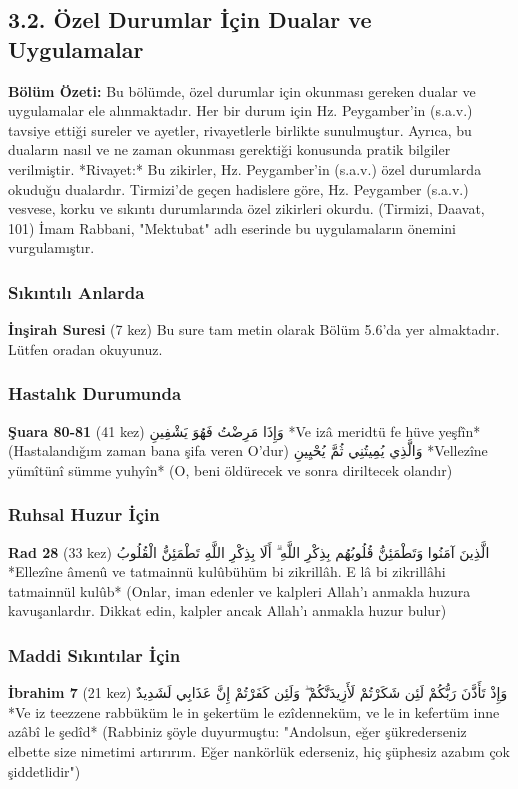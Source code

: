 \documentclass[12pt,a4paper]{article}
\begin{document}
\subsection{3.2. Özel Durumlar İçin Dualar ve Uygulamalar}
\textbf{Bölüm Özeti:}
Bu bölümde, özel durumlar için okunması gereken dualar ve uygulamalar ele alınmaktadır. Her bir durum için Hz. Peygamber'in (s.a.v.) tavsiye ettiği sureler ve ayetler, rivayetlerle birlikte sunulmuştur. Ayrıca, bu duaların nasıl ve ne zaman okunması gerektiği konusunda pratik bilgiler verilmiştir.
*Rivayet:* Bu zikirler, Hz. Peygamber'in (s.a.v.) özel durumlarda okuduğu dualardır. Tirmizi'de geçen hadislere göre, Hz. Peygamber (s.a.v.) vesvese, korku ve sıkıntı durumlarında özel zikirleri okurdu. (Tirmizi, Daavat, 101) İmam Rabbani, "Mektubat" adlı eserinde bu uygulamaların önemini vurgulamıştır.
\subsubsection{Sıkıntılı Anlarda}
\textbf{İnşirah Suresi} (7 kez)
Bu sure tam metin olarak Bölüm 5.6'da yer almaktadır. Lütfen oradan okuyunuz.
\subsubsection{Hastalık Durumunda}
\textbf{Şuara 80-81} (41 kez)
وَإِذَا مَرِضْتُ فَهُوَ يَشْفِينِ
*Ve izâ meridtü fe hüve yeşfîn*
(Hastalandığım zaman bana şifa veren O'dur)
وَالَّذِي يُمِيتُنِي ثُمَّ يُحْيِينِ
*Vellezîne yümîtünî sümme yuhyîn*
(O, beni öldürecek ve sonra diriltecek olandır)
\subsubsection{Ruhsal Huzur İçin}
\textbf{Rad 28} (33 kez)
الَّذِينَ آمَنُوا وَتَطْمَئِنُّ قُلُوبُهُم بِذِكْرِ اللَّهِ ۗ أَلَا بِذِكْرِ اللَّهِ تَطْمَئِنُّ الْقُلُوبُ
*Ellezîne âmenû ve tatmainnü kulûbühüm bi zikrillâh. E lâ bi zikrillâhi tatmainnül kulûb*
(Onlar, iman edenler ve kalpleri Allah'ı anmakla huzura kavuşanlardır. Dikkat edin, kalpler ancak Allah'ı anmakla huzur bulur)
\subsubsection{Maddi Sıkıntılar İçin}
\textbf{İbrahim 7} (21 kez)
وَإِذْ تَأَذَّنَ رَبُّكُمْ لَئِن شَكَرْتُمْ لَأَزِيدَنَّكُمْ ۖ وَلَئِن كَفَرْتُمْ إِنَّ عَذَابِي لَشَدِيدٌ
*Ve iz teezzene rabbüküm le in şekertüm le ezîdenneküm, ve le in kefertüm inne azâbî le şedîd*
(Rabbiniz şöyle duyurmuştu: "Andolsun, eğer şükrederseniz elbette size nimetimi artırırım. Eğer nankörlük ederseniz, hiç şüphesiz azabım çok şiddetlidir")
\end{document}
